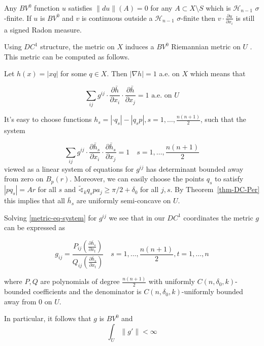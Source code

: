 \documentclass[12pt,leqno]{amsart}
\numberwithin{equation}{section}
\theoremstyle{definition}
\theoremstyle{remark}
\begin{document}
Any $BV^0$ function $u$ satisfies $\|du\|(A)=0$ for any $A\subset X\setminus S$ which is $\mathcal H_{n-1}$  $\sigma$-finite. If $u$ is $BV^0$ and $v$ is continuous outside a $\mathcal H_{n-1}$  $\sigma$-finite then
$v\cdot\frac{\partial u}{\partial x_i}$ is still a signed Radon measure.

Using $DC^1$ structure, the metric on $X$ induces a $BV^0$ Riemannian metric on $U$ \cite{Per-DC}. This metric can be computed as follows.

Let $h(x)=|xq|$ for some $q\in X$. Then $|\nabla h|=1$ a.e. on $X$ which means that

\begin{equation*}\label{metric-eq-1}
\sum_{ij}g^{ij}\cdot \frac{\partial \bar h}{\partial x_i}\cdot \frac{\partial \bar h}{\partial x_j}= 1 \text{ a.e. on } U
\end{equation*}

It's easy to choose  functions $h_s=|\cdot q_s|-|q_sp|, s=1,\ldots,  \frac{n(n+1)}{2}$, such that the system

\begin{equation}\label{metric-eq-system}
\sum_{ij}g^{ij}\cdot \frac{\partial \bar h_s}{\partial x_i}\cdot \frac{\partial \bar h_s}{\partial x_j}= 1 \quad s=1,\ldots,  \frac{n(n+1)}{2}
\end{equation}
viewed as a linear system of equations for $g^{ij}$ has determinant bounded away from zero on $B_p(r)$. Moreover, we can easily choose the points $q_s$ to satisfy $|pq_s|=Ar$ for all $s$ and   $\tilde\sphericalangle_k q_spa_j\ge \pi/2+\delta_0$ for all $j,s$.
By Theorem~\ref{thm-DC-Per} this implies that all $\bar h_s$ are uniformly semi-concave on $U$.

Solving \eqref{metric-eq-system} for $g^{ij}$ we see that in our $DC^1$ coordinates the metric $g$ can be expressed as

\begin{equation}\label{metric}
g_{ij}=\frac{P_{ij}(\frac{\partial \bar h_s}{\partial x_t})}{Q_{ij}(\frac{\partial \bar h_s}{\partial x_t})}\quad s=1,\ldots, \frac{n(n+1)}{2},t=1,\ldots, n
\end{equation}

where %
 $P,Q$ are polynomials of degree $\frac{n(n+1)}{2}$ with uniformly $C(n,\delta_0,k)$-bounded coefficients and the denominator is $C(n,\delta_0,k)$-uniformly bounded away from $0$ on $U$.


In particular, it follows that $g$ is $BV^0$ and
\begin{equation}\label{g'-bounded}
\int_U\|g'\|<\infty
\end{equation}
\end{document}
